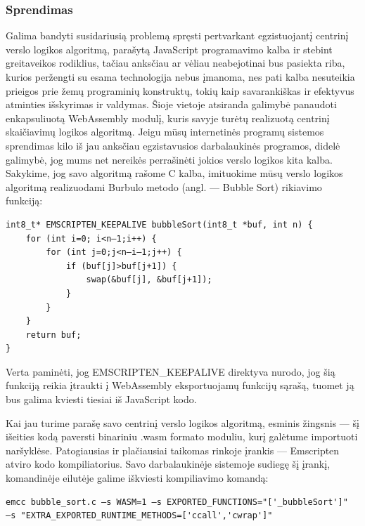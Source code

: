 \documentclass{VUMIFPSkursinis}
\begin{document}
\subsubsection{Sprendimas}
Galima bandyti susidariusią problemą spręsti pertvarkant egzistuojantį centrinį verslo logikos algoritmą, parašytą JavaScript programavimo kalba ir stebint greitaveikos rodiklius, tačiau anksčiau ar vėliau neabejotinai bus pasiekta riba, kurios peržengti su esama technologija nebus įmanoma, nes pati kalba nesuteikia prieigos prie žemų programinių konstruktų, tokių kaip savarankiškas ir efektyvus atminties išskyrimas ir valdymas. 
Šioje vietoje atsiranda galimybė panaudoti enkapsuliuotą WebAssembly modulį, kuris savyje turėtų realizuotą centrinį skaičiavimų logikos algoritmą. Jeigu mūsų internetinės programų sistemos sprendimas kilo iš jau anksčiau egzistavusios darbalaukinės programos, didelė galimybė, jog mums net nereikės perrašinėti jokios verslo logikos kita kalba. Sakykime, jog savo algoritmą rašome C kalba, imituokime mūsų verslo logikos algoritmą realizuodami Burbulo metodo (angl. — Bubble Sort) rikiavimo funkciją:

\begin{center}
\begin{small}
\begin{verbatim}
int8_t* EMSCRIPTEN_KEEPALIVE bubbleSort(int8_t *buf, int n) {
    for (int i=0; i<n—1;i++) {
        for (int j=0;j<n—i—1;j++) {
            if (buf[j]>buf[j+1]) {
                swap(&buf[j], &buf[j+1]);
            }
        }
    }
    return buf;
}
\end{verbatim}
\end{small}
\end{center}

Verta paminėti, jog EMSCRIPTEN\_KEEPALIVE direktyva nurodo, jog šią funkciją reikia įtraukti į WebAssembly eksportuojamų funkcijų sąrašą, tuomet ją bus galima kviesti tiesiai iš JavaScript kodo. 

Kai jau turime parašę savo centrinį verslo logikos algoritmą, esminis žingsnis — šį išeities kodą paversti binariniu .wasm formato moduliu, kurį galėtume importuoti naršyklėse. Patogiausias ir plačiausiai taikomas rinkoje įrankis — Emscripten atviro kodo kompiliatorius. Savo darbalaukinėje sistemoje sudiegę šį įrankį, komandinėje eilutėje galime iškviesti kompiliavimo komandą:

\begin{center}
\begin{small}
\begin{verbatim}
emcc bubble_sort.c —s WASM=1 —s EXPORTED_FUNCTIONS="['_bubbleSort']" 
—s "EXTRA_EXPORTED_RUNTIME_METHODS=['ccall','cwrap']"
\end{verbatim}
\end{small}
\end{center}
\end{document}
